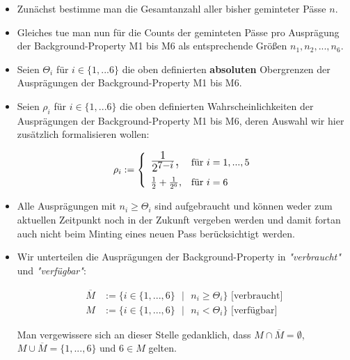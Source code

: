 \begin{Algo}

\begin{itemize}
    \item Zunächst bestimme man die Gesamtanzahl aller bisher geminteter Pässe $n$.
    \item Gleiches tue man nun für die Counts der geminteten Pässe pro Ausprägung der Background-Property M1 bis M6 als entsprechende Größen $n_1, n_2,...,n_6$.
    \item Seien $\Theta_i$ für $i \in \lbrace 1,...6 \rbrace$ die oben definierten \textbf{absoluten} Obergrenzen der \newline Ausprägungen der Background-Property M1 bis M6.
    \item Seien $\rho_i$ für $i \in \lbrace 1,...6 \rbrace$ die oben definierten Wahrscheinlichkeiten der \newline Ausprägungen der Background-Property M1 bis M6, deren Auswahl wir hier zusätzlich formalisieren wollen:
    
\[
\rho_i:=\left\{%
\begin{array}{ll}
    \hbox{\LARGE $\frac{1}{2^{7 - i}}$,} & \hbox{für $i = 1,...,5$} \\[0,3cm]
    \hbox{$\frac{1}{2} + \frac{1}{2^6}$,} & \hbox{für $i = 6$} \\
\end{array}%
\right.
\]    
    
    \item Alle Ausprägungen mit $n_i \geq \Theta_i$ sind aufgebraucht und können weder zum aktuellen Zeitpunkt noch in der Zukunft vergeben werden und damit fortan auch nicht beim Minting eines neuen Pass berücksichtigt werden.
    \item Wir unterteilen die Ausprägungen der Background-Property in \textit{"verbraucht"} und \textit{"verfügbar"}:
    
\begin{align*}
\overline{M} &:= \lbrace i \in \lbrace 1,...,6 \rbrace \textrm{ } | \textrm{ } n_i \geq \Theta_i \rbrace \textrm{     [verbraucht]} \\
M &:= \lbrace i \in \lbrace 1,...,6 \rbrace \textrm{ } | \textrm{ } n_i < \Theta_i \rbrace \textrm{     [verfügbar]}
\end{align*} 

Man vergewissere sich an dieser Stelle gedanklich, dass $M \cap \overline{M} = \emptyset$, $M \cup \overline{M} = \lbrace 1,...,6 \rbrace$ und $6 \in M$ gelten.
    

\end{itemize}
\end{Algo}
